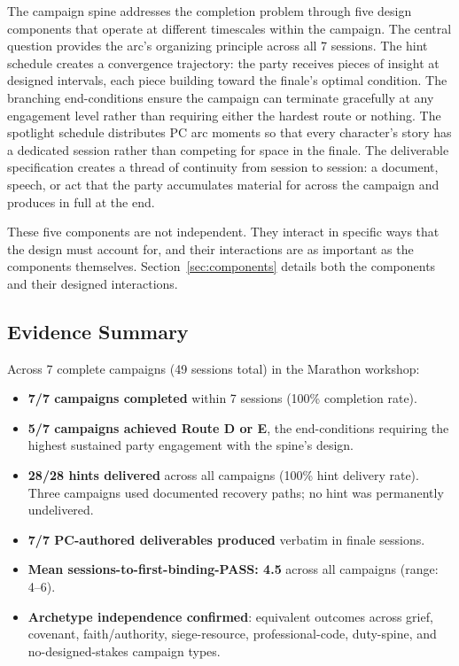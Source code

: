 The campaign spine addresses the completion problem through five design
components that operate at different timescales within the campaign.
The central question provides the arc's organizing principle across all
7 sessions. The hint schedule creates a convergence trajectory: the party
receives pieces of insight at designed intervals, each piece building toward
the finale's optimal condition. The branching end-conditions ensure the
campaign can terminate gracefully at any engagement level rather than
requiring either the hardest route or nothing. The spotlight schedule
distributes PC arc moments so that every character's story has a dedicated
session rather than competing for space in the finale. The deliverable
specification creates a thread of continuity from session to session:
a document, speech, or act that the party accumulates material for across
the campaign and produces in full at the end.

These five components are not independent. They interact in specific ways
that the design must account for, and their interactions are as important
as the components themselves. Section~\ref{sec:components} details both
the components and their designed interactions.

\subsection{Evidence Summary}

Across 7 complete campaigns (49 sessions total) in the Marathon workshop:

\begin{itemize}
  \item \textbf{7/7 campaigns completed} within 7 sessions (100\% completion rate).
  \item \textbf{5/7 campaigns achieved Route D or E}, the end-conditions
    requiring the highest sustained party engagement with the spine's design.
  \item \textbf{28/28 hints delivered} across all campaigns (100\% hint
    delivery rate). Three campaigns used documented recovery paths; no hint was
    permanently undelivered.
  \item \textbf{7/7 PC-authored deliverables produced} verbatim in finale sessions.
  \item \textbf{Mean sessions-to-first-binding-PASS: 4.5} across all campaigns
    (range: 4--6).
  \item \textbf{Archetype independence confirmed}: equivalent outcomes across grief,
    covenant, faith/authority, siege-resource, professional-code, duty-spine, and
    no-designed-stakes campaign types.
\end{itemize}

